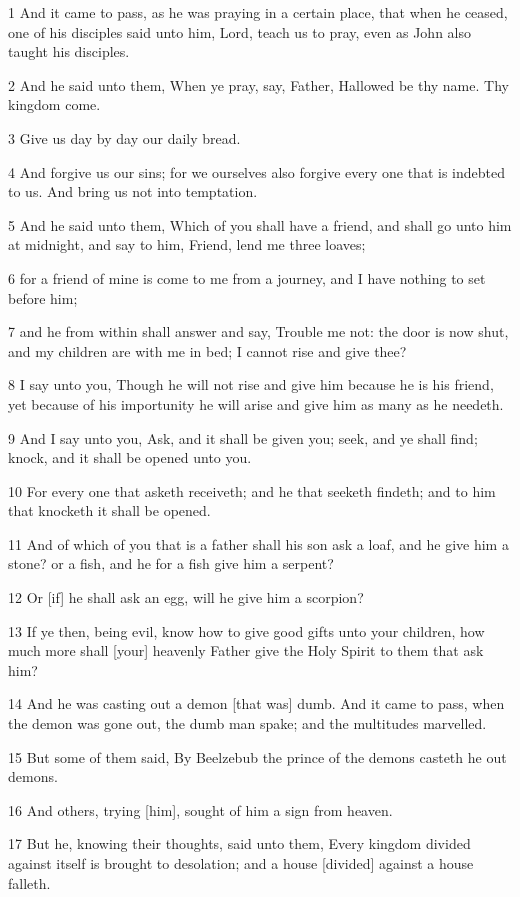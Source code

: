 \par 1 And it came to pass, as he was praying in a certain place, that when he ceased, one of his disciples said unto him, Lord, teach us to pray, even as John also taught his disciples.
\par 2 And he said unto them, When ye pray, say, Father, Hallowed be thy name. Thy kingdom come.
\par 3 Give us day by day our daily bread.
\par 4 And forgive us our sins; for we ourselves also forgive every one that is indebted to us. And bring us not into temptation.
\par 5 And he said unto them, Which of you shall have a friend, and shall go unto him at midnight, and say to him, Friend, lend me three loaves;
\par 6 for a friend of mine is come to me from a journey, and I have nothing to set before him;
\par 7 and he from within shall answer and say, Trouble me not: the door is now shut, and my children are with me in bed; I cannot rise and give thee?
\par 8 I say unto you, Though he will not rise and give him because he is his friend, yet because of his importunity he will arise and give him as many as he needeth.
\par 9 And I say unto you, Ask, and it shall be given you; seek, and ye shall find; knock, and it shall be opened unto you.
\par 10 For every one that asketh receiveth; and he that seeketh findeth; and to him that knocketh it shall be opened.
\par 11 And of which of you that is a father shall his son ask a loaf, and he give him a stone? or a fish, and he for a fish give him a serpent?
\par 12 Or [if] he shall ask an egg, will he give him a scorpion?
\par 13 If ye then, being evil, know how to give good gifts unto your children, how much more shall [your] heavenly Father give the Holy Spirit to them that ask him?
\par 14 And he was casting out a demon [that was] dumb. And it came to pass, when the demon was gone out, the dumb man spake; and the multitudes marvelled.
\par 15 But some of them said, By Beelzebub the prince of the demons casteth he out demons.
\par 16 And others, trying [him], sought of him a sign from heaven.
\par 17 But he, knowing their thoughts, said unto them, Every kingdom divided against itself is brought to desolation; and a house [divided] against a house falleth.
